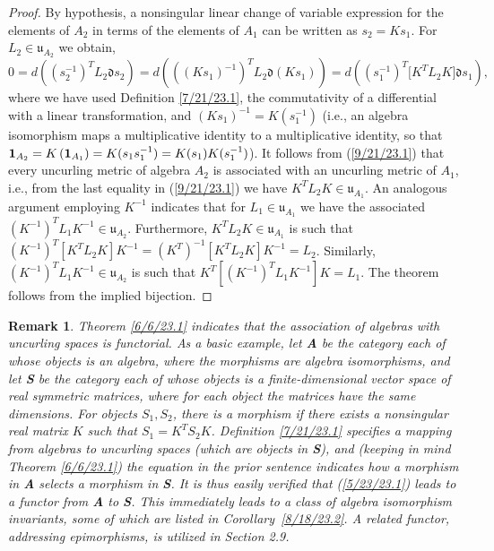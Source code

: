 \documentclass{amsart}
\numberwithin{equation}{section}
\newtheorem{remark}[theorem]{Remark}
\theoremstyle{definition}
\numberwithin{theorem}{section}
\begin{document}
\begin{proof} By hypothesis, a nonsingular linear change of variable expression for the elements of $A_2$ in terms of the elements of $A_1$ can be written as $s_2= Ks_1$. \mbox{For $L_2\in \mathfrak{u}_{A_2}$} we obtain, \begin{equation} 0 = d\left((s_2^{-1})^T L_2 \mathfrak{d}s_2\right) =  d\left(((Ks_1)^{-1})^T L_2 \mathfrak{d}(Ks_1)\right) = d\left((s_1^{-1})^T \big[K^T L_2K\big]\mathfrak{d}s_1\right), \label{9/21/23.1}  \end{equation} where we have used Definition \ref{7/21/23.1}, the commutativity of a differential with a linear transformation, and $(Ks_1)^{-1} = K(s_1^{-1})$ (i.e., an algebra isomorphism maps a multiplicative identity to a multiplicative identity, so that ${\bf 1}_{A_2} = K\left(\mathbf{1}_{A_1}\right) = K(s_1s_1^{-1}) = K(s_1)K(s_1^{-1})$).  It follows from (\ref{9/21/23.1}) that every uncurling metric  of algebra $A_2$ is associated with an uncurling metric of $A_1$, i.e., from the last equality in (\ref{9/21/23.1}) we have  $K^TL_2K\in\mathfrak{u}_{A_1}$.  An analogous argument employing $K^{-1}$ indicates that for $L_1\in\mathfrak{u}_{A_1}$ we have the associated $(K^{-1})^T L_1 K^{-1} \in \mathfrak{u}_{A_2}$.    Furthermore, $K^T L_2K\in\mathfrak{u}_{A_1}$ is such that $(K^{-1})^T [K^T L_2 K]K^{-1} = (K^T)^{-1} [K^T L_2 K]K^{-1} = L_2$.  Similarly, $(K^{-1})^T L_1K^{-1}\in\mathfrak{u}_{A_2}$ is such that $K^T[(K^{-1})^T L_1K^{-1}] K = L_1$.  The theorem follows from the implied bijection. 
\end{proof}

\begin{remark} \label{3/31/24.1} {\rm Theorem \ref{6/6/23.1} indicates that the association of algebras with uncurling spaces is functorial.  As a basic example, let {\bf A} be the category each of whose objects is an algebra, where the morphisms are algebra isomorphisms, and let {\bf S} be the category each of whose objects is a finite-dimensional vector space of real symmetric matrices, where for each object the matrices have the same dimensions.  For objects $S_1,S_2$, there is a morphism if there exists a nonsingular real matrix $K$ such that \mbox{$S_1  = K^T  S_2 K$.}    Definition \ref{7/21/23.1} specifies a mapping from algebras to uncurling spaces (which are objects in {\bf S}), and (keeping in mind Theorem \ref{6/6/23.1}) the equation in the prior sentence indicates how a morphism in {\bf A} selects a morphism in {\bf S}.  It is thus easily verified that (\ref{5/23/23.1}) leads to a functor from {\bf A} to {\bf S}.  This immediately leads to a class of algebra isomorphism invariants, some of which are listed in  \mbox{Corollary \ref{8/18/23.2}}.  A related functor, addressing epimorphisms, is utilized in Section 2.9}. \end{remark}
\end{document}
